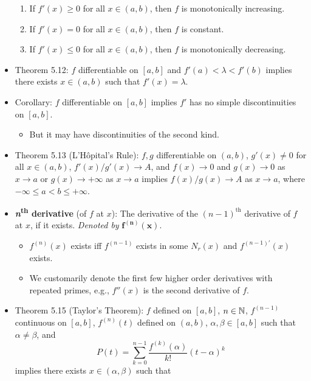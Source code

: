\documentclass[../../notes.tex]{subfiles}
\begin{document}
\begin{itemize}
    \begin{enumerate}[label={(\alph*)}]
        \item If $f'(x)\geq 0$ for all $x\in(a,b)$, then $f$ is monotonically increasing.
        \item If $f'(x)=0$ for all $x\in(a,b)$, then $f$ is constant.
        \item If $f'(x)\leq 0$ for all $x\in(a,b)$, then $f$ is monotonically decreasing.
    \end{enumerate}
    \item Theorem 5.12: $f$ differentiable on $[a,b]$ and $f'(a)<\lambda<f'(b)$ implies there exists $x\in(a,b)$ such that $f'(x)=\lambda$.
    \item Corollary: $f$ differentiable on $[a,b]$ implies $f'$ has no simple discontinuities on $[a,b]$.
    \begin{itemize}
        \item But it may have discontinuities of the second kind.
    \end{itemize}
    \item Theorem 5.13 (L'H\^{o}pital's Rule): $f,g$ differentiable on $(a,b)$, $g'(x)\neq 0$ for all $x\in(a,b)$, $f'(x)/g'(x)\to A$, and $f(x)\to 0$ and $g(x)\to 0$ as $x\to a$ or $g(x)\to +\infty$ as $x\to a$ implies $f(x)/g(x)\to A$ as $x\to a$, where $-\infty\leq a<b\leq +\infty$.
    \item \textbf{\emph{n}\textsuperscript{th} derivative} (of $f$ at $x$): The derivative of the $(n-1)^\text{th}$ derivative of $f$ at $x$, if it exists. \emph{Denoted by} $\bm{f^{(n)}(x)}$.
    \begin{itemize}
        \item $f^{(n)}(x)$ exists iff $f^{(n-1)}$ exists in some $N_r(x)$ and $f^{(n-1)'}(x)$ exists.
        \item We customarily denote the first few higher order derivatives with repeated primes, e.g., $f''(x)$ is the second derivative of $f$.
    \end{itemize}
    \item Theorem 5.15 (Taylor's Theorem): $f$ defined on $[a,b]$, $n\in\mathbb{N}$, $f^{(n-1)}$ continuous on $[a,b]$, $f^{(n)}(t)$ defined on $(a,b)$, $\alpha,\beta\in[a,b]$ such that $\alpha\neq\beta$, and
    \begin{equation*}
        P(t) = \sum_{k=0}^{n-1}\frac{f^{(k)}(\alpha)}{k!}(t-\alpha)^k
    \end{equation*}
    implies there exists $x\in(\alpha,\beta)$ such that
    \begin{equation*}

\end{equation*}
\end{itemize}
\end{document}
